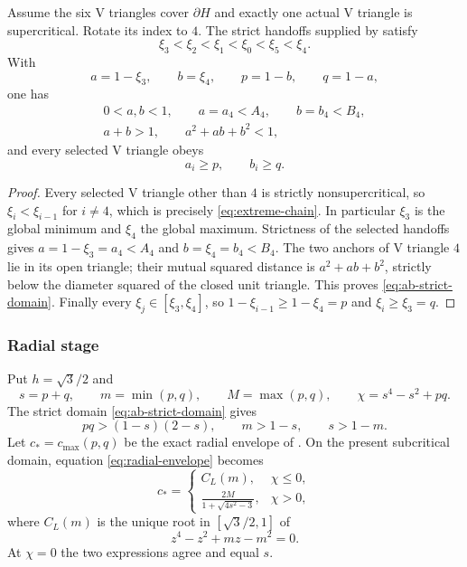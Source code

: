 \begin{lemma}
\label{lem:ab-extreme-jump}
Assume the six V triangles cover $\partial H$ and exactly one actual V triangle is
supercritical.  Rotate its index to $4$.  The strict handoffs supplied by
 satisfy
\[
 \xi_3<\xi_2<\xi_1<\xi_0<\xi_5<\xi_4.                       \label{eq:extreme-chain}
\]
With
\[
 a=1-\xi_3,\qquad b=\xi_4,\qquad p=1-b,\qquad q=1-a,
\]
one has
\begin{equation}
 \begin{gathered}
 0<a,b<1,
 \qquad a=a_4<A_4,
 \qquad b=b_4<B_4,\\
 a+b>1,
 \qquad a^2+ab+b^2<1,
 \end{gathered}
 \label{eq:ab-strict-domain}
\end{equation}
and every selected V triangle obeys
\[
 a_i\ge p,\qquad b_i\ge q.
\]
\end{lemma}

\begin{proof}
Every selected V triangle other than $4$ is strictly nonsupercritical, so
$\xi_i<\xi_{i-1}$ for $i\ne4$, which is precisely
\eqref{eq:extreme-chain}.  In particular $\xi_3$ is the global minimum and
$\xi_4$ the global maximum.  Strictness of the selected handoffs gives
$a=1-\xi_3=a_4<A_4$ and $b=\xi_4=b_4<B_4$.  The two anchors of V
triangle $4$ lie in its open triangle;
their mutual squared distance is $a^2+ab+b^2$, strictly below the diameter
squared of the closed unit triangle.  This proves \eqref{eq:ab-strict-domain}.
Finally every $\xi_j\in[\xi_3,\xi_4]$, so
$1-\xi_{i-1}\ge1-\xi_4=p$ and $\xi_i\ge \xi_3=q$.
\end{proof}

\subsubsection*{Radial stage}

Put $h=\sqrt3/2$ and
\[
 s=p+q,\qquad m=\min(p,q),\qquad M=\max(p,q),
 \qquad \chi=s^4-s^2+pq.
\]
The strict domain \eqref{eq:ab-strict-domain} gives
\begin{equation}
 pq>(1-s)(2-s),\qquad m>1-s,\qquad s>1-m.         \label{eq:pq-domain}
\end{equation}
Let $c_*=c_{\max}(p,q)$ be the exact radial envelope of
.  On the present subcritical
domain, equation \eqref{eq:radial-envelope} becomes
\begin{equation}
 c_*=\begin{cases}
 C_L(m),&\chi\le0,\\[1mm]
 \displaystyle\frac{2M}{1+\sqrt{4s^2-3}},&\chi>0,
 \end{cases}                                    \label{eq:core-cstar}
\end{equation}
where $C_L(m)$ is the unique root in $[\sqrt3/2,1]$ of
\[
 z^4-z^2+mz-m^2=0.
\]
At $\chi=0$ the two expressions agree and equal $s$.

